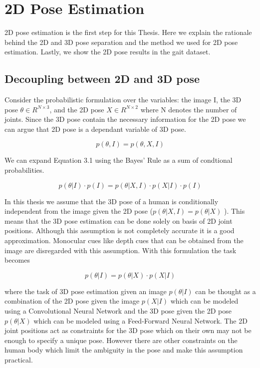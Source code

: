 
\chapter{2D Pose Estimation}\label{chapter:2dpose}

2D pose estimation is the first step for this Thesis. Here we explain the rationale behind the 2D and 3D pose separation and the method we used for 2D pose estimation. Lastly, we show the 2D pose results in the gait dataset. 

\section{Decoupling between 2D and 3D pose}

Consider the probabilistic formulation over the variables: the image I, the 3D pose $ \theta \in R^{N\times3} $, and the 2D pose $X \in R^{N\times2}$ where N denotes the number of joints. Since the 3D pose contain the necessary information for the 2D pose we can argue that 2D pose is a dependant variable of 3D pose.

\begin{equation}
    p(\theta,I) = p(\theta,X,I)
\end{equation}

We can expand Equation 3.1 using the Bayes' Rule as a sum of condtional probabilities. 

\begin{equation}
    p(\theta|I) \cdot p(I) = p(\theta|X,I) \cdot p(X|I) \cdot p(I)
\end{equation}

In this thesis we assume that the 3D pose of a human is conditionally independent from the image given the 2D pose ($p(\theta|X,I) = p(\theta|X)$ ). This means that the 3D pose estimation can be done solely on basis of 2D joint positions. Although this assumption is not completely accurate it is a good approximation. Monocular cues like depth cues that can be obtained from the image are disregarded with this assumption. With this formulation the task becomes 

\begin{equation}
    p(\theta|I) = p(\theta|X) \cdot p(X|I)
\end{equation} 

where the task of 3D pose estimation given an image $p(\theta|I)$ can be thought as a combination of the 2D pose given the image $p(X|I)$ which can be modeled using a Convolutional Neural Network and the 3D pose given the 2D pose $p(\theta|X)$ which can be modeled using a Feed-Forward Neural Network. The 2D joint positions act as constraints for the 3D pose which on their own may not be enough to specify a unique pose. However there are other constraints on the human body which limit the ambiguity in the pose and make this assumption practical.

